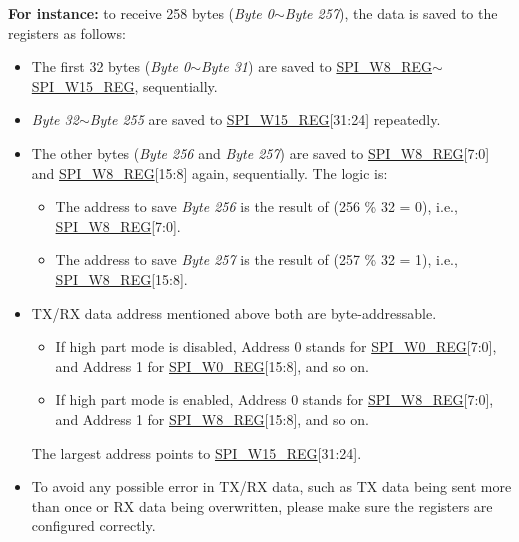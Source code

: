 \documentclass[main\_\_EN.tex]{subfiles}
\begin{document}
\begin{itemize}
\begin{itemize}
        \textbf{For instance:} to receive 258 bytes (\emph{Byte 0}$\sim$\emph{Byte 257}), the data is saved to the registers as follows:
        \begin{itemize}
            \item The first 32 bytes (\emph{Byte 0}$\sim$\emph{Byte 31}) are saved to \hyperref[regdesc:SPIW8REG]{SPI\_W8\_REG}$\sim$\hyperref[regdesc:SPIW15REG]{SPI\_W15\_REG}, sequentially.
            \item \emph{Byte 32}$\sim$\emph{Byte 255} are saved to \hyperref[regdesc:SPIW15REG]{SPI\_W15\_REG}[31:24] repeatedly.
            \item The other bytes (\emph{Byte 256} and \emph{Byte 257}) are saved to \hyperref[regdesc:SPIW8REG]{SPI\_W8\_REG}[7:0] and \hyperref[regdesc:SPIW8REG]{SPI\_W8\_REG}[15:8] again, sequentially. The logic is:
            \begin{itemize}
                \item The address to save \emph{Byte 256} is the result of (256 \% 32 = 0), i.e., \hyperref[regdesc:SPIW8REG]{SPI\_W8\_REG}[7:0].
                \item The address to save \emph{Byte 257} is the result of (257 \% 32 = 1), i.e., \hyperref[regdesc:SPIW8REG]{SPI\_W8\_REG}[15:8].
            \end{itemize}
        \end{itemize}
    \end{itemize}
\end{itemize}

\begin{tiplisting}
\vspace{-2em}
\begin{itemize}
    \item TX/RX data address mentioned above both are byte-addressable.
    \begin{itemize}
        \item If high part mode is disabled, Address 0 stands for \hyperref[regdesc:SPIW0REG]{SPI\_W0\_REG}[7:0], and Address 1 for \hyperref[regdesc:SPIW0REG]{SPI\_W0\_REG}[15:8], and so on.
        \item If high part mode is enabled, Address 0 stands for \hyperref[regdesc:SPIW8REG]{SPI\_W8\_REG}[7:0], and Address 1 for \hyperref[regdesc:SPIW8REG]{SPI\_W8\_REG}[15:8], and so on.
    \end{itemize}
    The largest address points to \hyperref[regdesc:SPIW15REG]{SPI\_W15\_REG}[31:24].
    \item To avoid any possible error in TX/RX data, such as TX data being sent more than once or RX data being overwritten, please make sure the registers are configured correctly.
\end{itemize}
\end{tiplisting}
\end{document}
